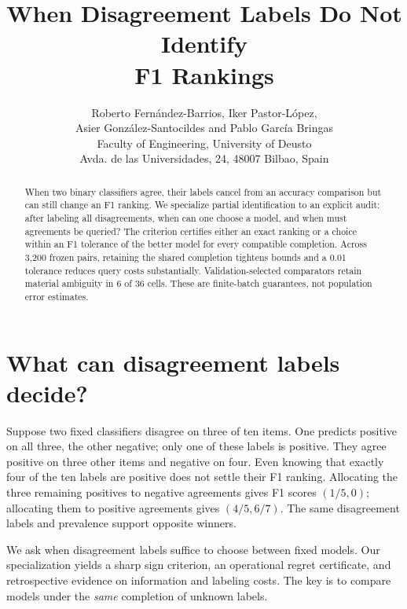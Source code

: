 \documentclass[a4paper]{esannV2}
\newcommand{\F}{F_1}
\begin{document}
\title{When Disagreement Labels Do Not Identify\protect\\F1 Rankings}
\author{Roberto Fern\'andez-Barrios, Iker Pastor-L\'opez,\\
Asier Gonz\'alez-Santocildes and Pablo Garc\'ia Bringas
\vspace{.3cm}\\
Faculty of Engineering, University of Deusto\\
Avda. de las Universidades, 24, 48007 Bilbao, Spain
}
\maketitle
\begin{abstract}
When two binary classifiers agree, their labels cancel from an accuracy
comparison but can still change an F1 ranking. We specialize partial
identification to an explicit audit: after labeling all disagreements,
when can one choose a model, and when must agreements be queried?
The criterion certifies either an exact ranking or a choice within an F1
tolerance of the better model for every compatible completion. Across 3,200
frozen pairs, retaining the shared completion tightens bounds and a 0.01 tolerance
reduces query costs substantially. Validation-selected comparators retain
material ambiguity in 6 of 36 cells. These are finite-batch guarantees,
not population error estimates.
\end{abstract}

\section{What can disagreement labels decide?}
Suppose two fixed classifiers disagree on three of ten items. One predicts
positive on all three, the other negative; only one of these labels is positive.
They agree positive on three other items and negative on four. Even knowing
that exactly four of the ten labels are positive does not settle their F1
ranking. Allocating the three remaining positives to negative agreements gives
F1 scores $(1/5,0)$; allocating them to positive agreements gives $(4/5,6/7)$.
The same disagreement labels and prevalence support opposite winners.

We ask when disagreement labels suffice to choose between fixed models.
Our specialization yields a sharp sign criterion, an operational regret
certificate, and retrospective evidence on information and labeling costs.
The key is to compare models under the \emph{same} completion of unknown labels.
\end{document}

